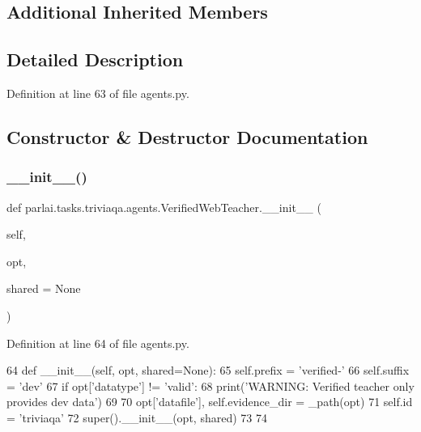 \subsection*{Additional Inherited Members}


\subsection{Detailed Description}


Definition at line 63 of file agents.\+py.



\subsection{Constructor \& Destructor Documentation}
\mbox{\label{classparlai_1_1tasks_1_1triviaqa_1_1agents_1_1VerifiedWebTeacher_a24150c529859f238cecd45835b93111a}} 
\subsubsection{\texorpdfstring{\+\_\+\+\_\+init\+\_\+\+\_\+()}{\_\_init\_\_()}}
{\footnotesize\ttfamily def parlai.\+tasks.\+triviaqa.\+agents.\+Verified\+Web\+Teacher.\+\_\+\+\_\+init\+\_\+\+\_\+ (\begin{DoxyParamCaption}\item[{}]{self,  }\item[{}]{opt,  }\item[{}]{shared = {\ttfamily None} }\end{DoxyParamCaption})}



Definition at line 64 of file agents.\+py.


\begin{DoxyCode}
64     \textcolor{keyword}{def }\_\_init\_\_(self, opt, shared=None):
65         self.prefix = \textcolor{stringliteral}{'verified-'}
66         self.suffix = \textcolor{stringliteral}{'dev'}
67         \textcolor{keywordflow}{if} opt[\textcolor{stringliteral}{'datatype'}] != \textcolor{stringliteral}{'valid'}:
68             print(\textcolor{stringliteral}{'WARNING: Verified teacher only provides dev data'})
69 
70         opt[\textcolor{stringliteral}{'datafile'}], self.evidence\_dir = \_path(opt)
71         self.id = \textcolor{stringliteral}{'triviaqa'}
72         super().\_\_init\_\_(opt, shared)
73 
74 
\end{DoxyCode}


